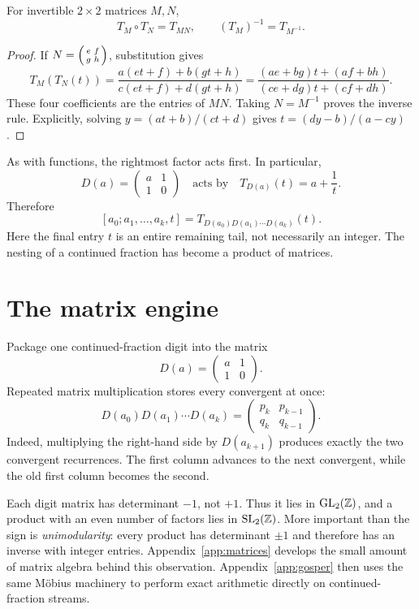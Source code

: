 \begin{proposition}
For invertible $2\times2$ matrices $M,N$,
\[
 T_M\circ T_N=T_{MN},\qquad (T_M)^{-1}=T_{M^{-1}}.
\]
\end{proposition}
\begin{proof}
If $N=\begin{psmallmatrix}e&f\\g&h\end{psmallmatrix}$, substitution gives
\[
 T_M(T_N(t))
 =\frac{a(et+f)+b(gt+h)}{c(et+f)+d(gt+h)}
 =\frac{(ae+bg)t+(af+bh)}{(ce+dg)t+(cf+dh)}.
\]
These four coefficients are the entries of $MN$. Taking $N=M^{-1}$
proves the inverse rule. Explicitly, solving $y=(at+b)/(ct+d)$ gives
$t=(dy-b)/(a-cy)$.
\end{proof}

As with functions, the rightmost factor acts first. In particular,
\[
 D(a)=\begin{pmatrix}a&1\\1&0\end{pmatrix}
 \quad\text{acts by}\quad T_{D(a)}(t)=a+\frac1t.
\]
Therefore
\[
 [a_0;a_1,\ldots,a_k,t]=T_{D(a_0)D(a_1)\cdots D(a_k)}(t).
\]
Here the final entry $t$ is an entire remaining tail, not necessarily an
integer. The nesting of a continued fraction has become a product of
matrices.

\section{The matrix engine}

Package one continued-fraction digit into the matrix
\[
  D(a)=\begin{pmatrix}a&1\\1&0\end{pmatrix}.
\]
Repeated matrix multiplication stores every convergent at once:
\begin{equation}\label{eq:cf-matrix-product}
 D(a_0)D(a_1)\cdots D(a_k)
 =\begin{pmatrix}p_k&p_{k-1}\\q_k&q_{k-1}\end{pmatrix}.
\end{equation}
Indeed, multiplying the right-hand side by $D(a_{k+1})$ produces exactly the
two convergent recurrences. The first column advances to the next convergent,
while the old first column becomes the second.

Each digit matrix has determinant $-1$, not $+1$. Thus it lies in
$\operatorname{GL}_2(\mathbb Z)$, and a product with an even number of factors lies
in $\operatorname{SL}_2(\mathbb Z)$. More important than the sign is
\emph{unimodularity}: every product has determinant $\pm1$ and therefore has
an inverse with integer entries. Appendix~\ref{app:matrices} develops the
small amount of matrix algebra behind this observation.  Appendix~\ref{app:gosper}
then uses the same M\"obius machinery to perform exact arithmetic directly on
continued-fraction streams.

